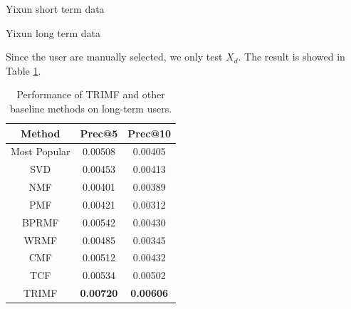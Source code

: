\begin{subsubsection}{Yixun short term data}
\begin{table}
\end{table}
\end{subsubsection}


\begin{subsubsection}
  {Yixun long term data}
\par{Since the user are manually selected, we only test $X_d$. The result is showed in Table \ref{longterm}.}

\begin{table}
  \centering
  \begin{tabular}{|c|c|c|}
    \hline
    Method&Prec@5&Prec@10\\
    \hline
    Most Popular&0.00508&0.00405\\
    \hline
    SVD&0.00453&0.00413\\
    \hline
    NMF&0.00401&0.00389\\
    \hline
    PMF&0.00421&0.00312\\
    \hline
    BPRMF&0.00542&0.00430\\
    \hline
    WRMF&0.00485&0.00345\\
    \hline
    CMF&0.00512&0.00432\\
    \hline
    TCF&0.00534&0.00502\\
    \hline
    TRIMF&\textbf{\color{red}0.00720}&\textbf{\color{red}0.00606}\\
    \hline
  \end{tabular}
  \caption{Performance of TRIMF and other baseline methods on long-term users.}
\label{longterm}
\end{table}
\end{subsubsection}



